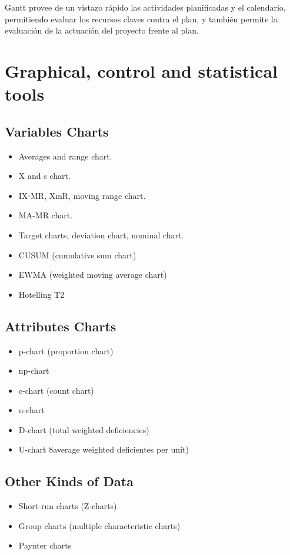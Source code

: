 \documentclass[oneside]{book}
\begin{document}
Gantt provee de un vistazo rápido las actividades planificadas y el calendario, permitiendo evaluar los recursos claves contra el plan, y también permite la evaluación de la actuación del proyecto frente al plan.

\section{Graphical, control and statistical tools}

\subsection{Variables Charts}

\begin{itemize}
	\item Averages and range chart.
	\item X and s chart.
	\item IX-MR, XmR, moving range chart.
	\item MA-MR chart.
	\item Target charts, deviation chart, nominal chart.
	\item CUSUM (cumulative sum chart)
	\item EWMA (weighted moving average chart)
	\item Hotelling T2
\end{itemize}

\subsection{Attributes Charts}

\begin{itemize}
	\item p-chart (proportion chart)
	\item np-chart
	\item c-chart (count chart)
	\item u-chart
	\item D-chart (total weighted deficiencies)
	\item U-chart 8average weighted deficientes per unit)
\end{itemize}

\subsection{Other Kinds of Data}

\begin{itemize}
	\item Short-run charts (Z-charts)
	\item Group charts (multiple characteristic charts)
	\item Paynter charts
\end{itemize}
\end{document}
